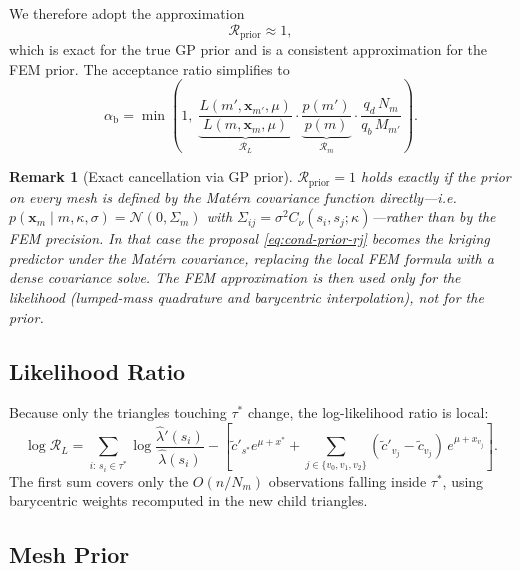 \documentclass[11pt]{article}
\newtheorem{remark}{Remark}
\begin{document}
We therefore adopt the approximation
\begin{equation}
  \mathcal{R}_\mathrm{prior} \approx 1,
  \label{eq:Rprior-approx}
\end{equation}
which is exact for the true GP prior and is a consistent approximation for
the FEM prior.  The acceptance ratio simplifies to
\begin{equation}
  \boxed{
  \alpha_\mathrm{b} = \min\!\left(1,\;
    \underbrace{\frac{L(m',\mathbf{x}_{m'},\mu)}
                     {L(m,\mathbf{x}_m,\mu)}}_{\mathcal{R}_L}
    \cdot
    \underbrace{\frac{p(m')}{p(m)}}_{\mathcal{R}_m}
    \cdot\frac{q_d\,N_m}{q_b\,M_{m'}}
  \right).}
  \label{eq:rj-acc-simple}
\end{equation}

\begin{remark}[Exact cancellation via GP prior]
$\mathcal{R}_\mathrm{prior}=1$ holds \emph{exactly} if the prior on every mesh
is defined by the Mat\'ern covariance function directly---i.e.\
$p(\mathbf{x}_m\mid m,\kappa,\sigma)=\mathcal{N}(0,\Sigma_m)$ with
$\Sigma_{ij}=\sigma^2 C_\nu(s_i,s_j;\kappa)$---rather than by the FEM
precision.  In that case the proposal \eqref{eq:cond-prior-rj} becomes the
kriging predictor under the Mat\'ern covariance, replacing the local FEM
formula with a dense covariance solve.  The FEM approximation is then used
only for the likelihood (lumped-mass quadrature and barycentric interpolation),
not for the prior.
\end{remark}

\subsection{Likelihood Ratio}
\label{sec:rj-ll}

Because only the triangles touching $\tau^*$ change, the log-likelihood ratio
is local:
\begin{equation}
  \log\mathcal{R}_L
  = \!\sum_{i:\,s_i\in\tau^*}\!\!\!\log\frac{\hat\lambda'(s_i)}{\hat\lambda(s_i)}
  - \left[\tilde{c}'_{s^*}e^{\mu+x^*}
    + \sum_{j\in\{v_0,v_1,v_2\}}\!(\tilde{c}'_{v_j}-\tilde{c}_{v_j})\,e^{\mu+x_{v_j}}\right].
  \label{eq:rj-ll}
\end{equation}
The first sum covers only the $O(n/N_m)$ observations falling inside $\tau^*$,
using barycentric weights recomputed in the new child triangles.

\subsection{Mesh Prior}
\label{sec:mesh-prior}
\end{document}
